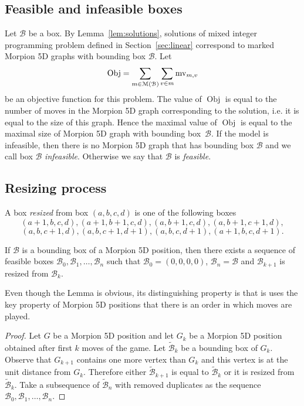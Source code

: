 \subsection{Feasible and infeasible boxes}

Let $\mathcal{B}$ be a box.
By Lemma~\ref{lem:solutions}, solutions of mixed integer programming problem
  defined in Section~\ref{sec:linear} correspond to marked Morpion 5D graphs with bounding
  box $\mathcal{B}$.
Let
  \[
    \operatorname{Obj} = \sum_{m \in \mathcal{M}(\mathcal{B})} \sum_{v \in m} \operatorname{mv}_{m, v}
  \]
be an objective function for this problem. The value of $\operatorname{Obj}$ is equal to the number
 of moves in the   Morpion 5D graph corresponding to the solution, i.e. it is equal to the size of this graph.
Hence the maximal value of $\operatorname{Obj}$ is equal to the maximal size of Morpion 5D graph with bounding box~$\mathcal{B}$.
If the model is infeasible, then there is no Morpion 5D graph that has bounding box $\mathcal{B}$ and we call box $\mathcal{B}$ \emph{infeasible}. Otherwise we say that $\mathcal{B}$ is \emph{feasible}.

\subsection{Resizing process}

\begin{definition} A box \emph{resized} from box $(a, b, c, d)$ is one of the following boxes
\[
  (a + 1, b, c, d), (a + 1, b +1 , c, d),  (a, b + 1, c, d), 
(a, b + 1, c + 1, d), 
\]
\[
(a, b, c + 1, d), (a, b, c + 1, d + 1),
(a, b, c, d + 1), (a + 1, b, c, d + 1).     
\]
\end{definition}

\begin{lemma}\label{lem:resizing}
If $\mathcal{B}$ is a bounding box of a Morpion 5D position, then there exists a sequence of
  feasible
  boxes $\mathcal{B}_0, \mathcal{B}_1, \ldots, \mathcal{B}_n$ such that
  $\mathcal{B}_0 = (0,0,0,0)$, $\mathcal{B}_n = \mathcal{B}$ and 
  $\mathcal{B}_{k+1}$ is resized from $\mathcal{B}_{k}$.
\end{lemma}

Even though the Lemma is obvious, its distinguishing property is that
  is uses the key property of Morpion 5D positions that there is an order in which moves are played.
  
\begin{proof}
Let $G$ be a Morpion 5D position and let $G_k$ be a Morpion 5D position
  obtained after first $k$ moves of the game.
Let $\widetilde{\mathcal{B}}_k$ be a bounding box of $G_k$.
Observe that $G_{k+1}$ contains one more vertex than $G_{k}$ and this vertex is at the unit distance
  from $G_{k}$.
Therefore either $\widetilde{\mathcal{B}}_{k+1}$ is equal to $\widetilde{\mathcal{B}}_k$ or it is resized from $\widetilde{\mathcal{B}}_k$.
Take a subsequence of $\widetilde{\mathcal{B}}_n$ with removed duplicates as the sequence $\mathcal{B}_0, \mathcal{B}_1, \ldots, \mathcal{B}_n$.
\end{proof}

